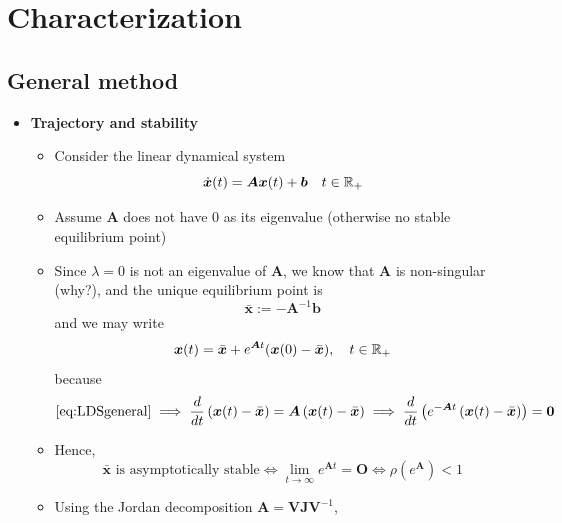 \documentclass[12pt,a4paper]{article}
\begin{document}
\section{Characterization}

\subsection{General method}

\begin{itemize}

\item \textbf{Trajectory and stability}
  \begin{itemize}
  \item Consider the linear dynamical system
    \begin{equation}\label{eq:LDSgeneral}%
      \dot{\bm{x}}(t) = \bm{A}\bm{x}(t) + \bm{b}
      \quad t \in \R_{+}
    \end{equation}
  \item Assume $\bm{A}$ does not have $0$ as its eigenvalue
    (otherwise no stable equilibrium point)
  \item Since $\lambda=0$ is not an eigenvalue of $\bm{A}$,
    we know that $\bm{A}$ is non-singular (why?), and 
    the unique equilibrium point is
    \begin{equation}\nonumber%
      \bar{\bm{x}} := -\bm{A}^{-1}\bm{b}
    \end{equation}
    and we may write
    \begin{equation}\label{eq:xt1}%
      \bm{x}(t) = \bar{\bm{x}} + e^{\bm{A}t}(\bm{x}(0)-\bar{\bm{x}}),
      \quad t \in \R_{+}
    \end{equation}
    because
    \begin{equation}\nonumber%
      \eqref{eq:LDSgeneral}
      \implies
      \frac{d}{dt}\left(\bm{x}(t) - \bar{\bm{x}}\right)
      = \bm{A}\left(\bm{x}(t) - \bar{\bm{x}}\right)
      \implies
      \frac{d}{dt}\left(e^{-\bm{A}t}\left(\bm{x}(t) - \bar{\bm{x}}\right)\right)
      = \bm{0}
    \end{equation}
  \item Hence,
    \begin{equation}\nonumber%
      \text{$\bar{\bm{x}}$ is asymptotically stable}
      \iff
      \lim_{t\to\infty}e^{\bm{A}t} = \bm{O}
      \iff
      \rho(e^{\bm{A}}) < 1
    \end{equation}
  \item Using the Jordan decomposition $\bm{A}=\bm{V}\bm{J}\bm{V}^{-1}$,

\end{itemize}
\end{itemize}
\end{document}
